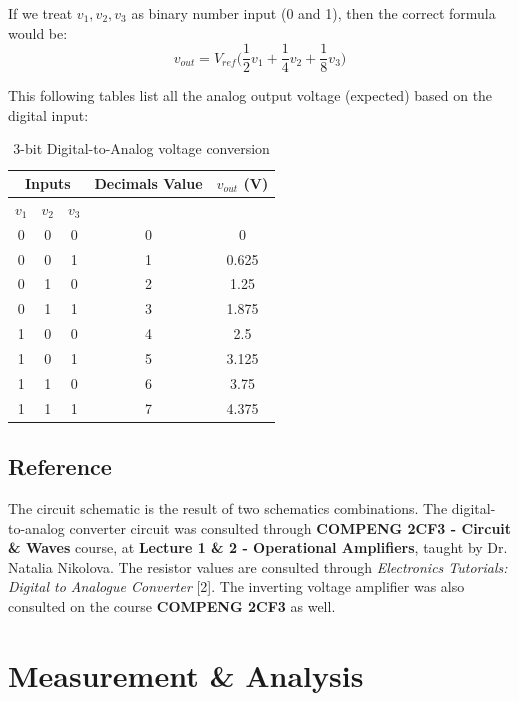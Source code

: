 \documentclass[12pt]{article}
\begin{document}
    If we treat \(v_1,v_2,v_3\) as binary number input (0 and 1), then the correct formula would be: 
    \[v_{out}=V_{ref}\Big( \frac{1}{2} v_1 + \frac{1}{4}v_2+\frac{1}{8}v_3\Big)\]

    This following tables list all the analog output voltage (expected) based on the digital input: 
    \begin{table}[H]
        \centering
        \begin{tabular}{|c|c|c|c|c|}
            \hline
            \multicolumn{3}{|c|}{\textbf{Inputs}} & \textbf{Decimals Value} & \(v_{out}\) (V) \\ \hline
            \(v_1\) & \(v_2\) & \(v_3\) &  & \\ \hline
            0 & 0 & 0 & 0 & 0 \\ \hline
            0 & 0 & 1 & 1 & 0.625 \\ \hline
            0 & 1 & 0 & 2 & 1.25 \\ \hline
            0 & 1 & 1 & 3 & 1.875 \\ \hline
            1 & 0 & 0 & 4 & 2.5 \\ \hline
            1 & 0 & 1 & 5 & 3.125 \\ \hline
            1 & 1 & 0 & 6 & 3.75 \\ \hline
            1 & 1 & 1 & 7 & 4.375 \\ \hline
        \end{tabular}
        \caption{3-bit Digital-to-Analog voltage conversion}
    \end{table}
     

     
    \subsection{Reference}

    The circuit schematic is the result of two schematics combinations. The digital-to-analog converter circuit was consulted through \textbf{COMPENG 2CF3 - Circuit \& Waves} course, at \textbf{Lecture 1 \& 2 - Operational Amplifiers}, taught by Dr. Natalia Nikolova. The resistor values are consulted through \textit{Electronics Tutorials: Digital to Analogue Converter} [2]. The inverting voltage amplifier was also consulted on the course \textbf{COMPENG 2CF3} as well. 


    \section{Measurement \& Analysis}
\end{document}

